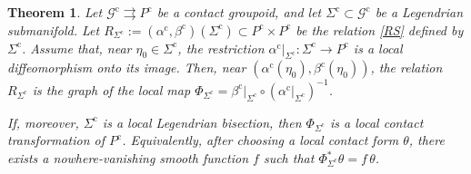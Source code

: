 \documentclass[11pt]{article}
\newtheorem{theorem}{Theorem}[section]
\begin{document}
\begin{theorem}
\label{thm:regular-legendrian-relation}
Let \(\mathcal G^{\mathrm c}\rightrightarrows P^{\mathrm c}\) be a contact
groupoid, and let \(\Sigma^{\mathrm c}\subset\mathcal G^{\mathrm c}\) be a
Legendrian submanifold. Let
$R_{\Sigma^{\mathrm c}}
:=
(\alpha^{\mathrm c},\beta^{\mathrm c})(\Sigma^{\mathrm c})
\subset P^{\mathrm c}\times P^{\mathrm c}$
be the relation \eqref{RS} defined by \(\Sigma^{\mathrm c}\). Assume that, near
\(\eta_0\in\Sigma^{\mathrm c}\), the restriction
$\alpha^{\mathrm c}|_{\Sigma^{\mathrm c}}:\Sigma^{\mathrm c}\rightarrow
P^{\mathrm c}$ is a local diffeomorphism onto its image. Then, near
\((\alpha^{\mathrm c}(\eta_0),\beta^{\mathrm c}(\eta_0))\), the relation
\(R_{\Sigma^{\mathrm c}}\) is the graph of the local map
$\Phi_{\Sigma^{\mathrm c}}
=
\beta^{\mathrm c}|_{\Sigma^{\mathrm c}}
\circ
\left(\alpha^{\mathrm c}|_{\Sigma^{\mathrm c}}\right)^{-1}$.

If, moreover, \(\Sigma^{\mathrm c}\) is a local Legendrian bisection, then
\(\Phi_{\Sigma^{\mathrm c}}\) is a local contact transformation of
\(P^{\mathrm c}\). Equivalently, after choosing a local contact form \(\theta\),
there exists a nowhere-vanishing smooth function \(f\) such that
$\Phi_{\Sigma^{\mathrm c}}^*\theta=f\,\theta$.
\end{theorem}
\end{document}
